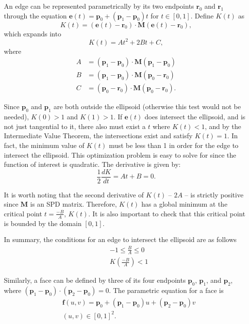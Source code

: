 An edge can be represented parametrically by its two endpoints $\bm{r}_0$ and $\bm{r}_1$ through the equation $\bm{e}(t) = \bm{p}_0 + (\bm{p}_1 - \bm{p}_0)t$ for $t \in [0, 1]$. Define $K(t)$ as
\begin{equation}
    K(t) = (\bm{e}(t) - \bm{r}_0) \cdot \bm{M}(\bm{e}(t) - \bm{r}_0),
\end{equation} 
which expands into
\begin{equation}
    K(t) = At^2 + 2Bt + C,
\end{equation}
where
\begin{align}
    A &= (\bm{p}_1 - \bm{p}_0) \cdot \bm{M} (\bm{p}_1 - \bm{p}_0) \\
    B &= (\bm{p}_1 - \bm{p}_0) \cdot \bm{M} (\bm{p}_0 - \bm{r}_0) \\
    C &= (\bm{p}_0 - \bm{r}_0) \cdot \bm{M}(\bm{p}_0 - \bm{r}_0).
\end{align}

Since $\bm{p}_0$ and $\bm{p}_1$ are both outside the ellipsoid (otherwise this test would not be needed), $K(0) > 1$ and $K(1) > 1$. If $\bm{e}(t)$ does intersect the ellipsoid, and is not just tangential to it, 
there also must exist a $t$ where $K(t) < 1$, and by the Intermediate Value Theorem, the intersections exist and satisfy $K(t) = 1$. In fact, the minimum value of $K(t)$ must be less than 1 in order for the edge
to intersect the ellipsoid. This optimization problem is easy to solve for since the function of interest is quadratic. The derivative is given by:
\begin{equation}
    \frac{1}{2}\frac{dK}{dt} = At + B = 0. 
\end{equation}

It is worth noting that the second derivative of $K(t)$ -- $2A$ -- is strictly positive since $\bm{M}$ is an SPD matrix. Therefore, $K(t)$ has a global minimum at the critical point $\displaystyle t = \frac{-B}{A}$, $K(t)$.
It is also important to check that this critical point is bounded by the domain $[0, 1]$.

In summary, the conditions for an edge to intersect the ellipsoid are as follows
\begin{align}
    &-1 \leq \frac{B}{A} \leq 0 \\
    &K\left(\frac{-B}{A} \right) < 1
\end{align}

Similarly, a face can be defined by three of its four endpoints $\bm{p}_0$, $\bm{p}_1$, and $\bm{p}_2$, where $(\bm{p}_1 - \bm{p}_0) \cdot (\bm{p}_2 - \bm{p}_0) = 0$. The parametric equation for a face is
\begin{align*}
    &\bm{f}(u,v) = \bm{p}_0 + (\bm{p}_1 - \bm{p}_0)u + (\bm{p}_2 - \bm{p}_0)v \\
    &(u, v) \in [0, 1]^2.
\end{align*}

